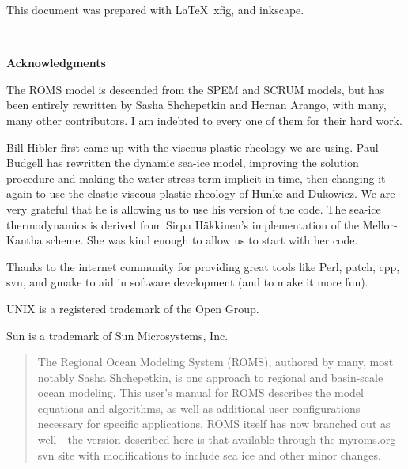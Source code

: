 \setcounter{page}{0}
This document was prepared with \LaTeX\, xfig, and inkscape.

\mbox{  }
\begin{center}
\bf \LARGE Acknowledgments
\end{center}

The ROMS model is descended from the SPEM and SCRUM models, but has
been entirely rewritten by Sasha Shchepetkin and Hernan Arango, with
many, many other contributors. I am indebted to every one of them
for their hard work.

Bill Hibler first came up with the viscous-plastic rheology we are
using. Paul Budgell has rewritten the dynamic sea-ice model, improving
the solution procedure and making the water-stress term implicit in time,
then changing it again to use the elastic-viscous-plastic rheology of
Hunke and Dukowicz. We are very grateful that he is allowing us to use
his version of the code. The sea-ice thermodynamics is derived from
Sirpa H\"akkinen's implementation of the Mellor-Kantha scheme. She was
kind enough to allow us to start with her code.

Thanks to the internet community for providing great tools like Perl,
patch, cpp, svn, and gmake to aid in software development (and to make
it more fun).


\vspace{\fill}
UNIX is a registered trademark of the Open Group.

Sun is a trademark of Sun Microsystems, Inc.


\vfil\break
\begin{abstract}
The Regional Ocean Modeling System (ROMS), authored by many, most
notably Sasha Shchepetkin, is one approach to regional and basin-scale ocean
modeling. This user's manual for ROMS describes the model equations
and algorithms, as well as additional user configurations necessary
for specific applications. ROMS itself has now branched out as
well - the version described here is that available through the
myroms.org svn site with modifications to include sea ice and other
minor changes.

\end{abstract}
